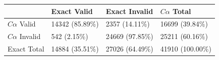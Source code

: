 \begin{tabular}{llll}
\toprule
 & Exact Valid & Exact Invalid & $C\alpha$ Total \\
\midrule
$C\alpha$ Valid & 14342 (85.89\%) & 2357 (14.11\%) & 16699 (39.84\%) \\
$C\alpha$ Invalid & 542 (2.15\%) & 24669 (97.85\%) & 25211 (60.16\%) \\
Exact Total & 14884 (35.51\%) & 27026 (64.49\%) & 41910 (100.00\%) \\
\bottomrule
\end{tabular}
